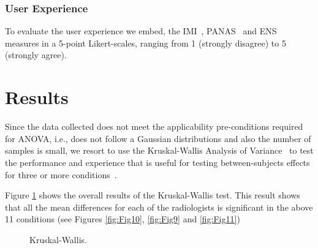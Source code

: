 \documentclass{chi-ext}
\begin{document}
\subsubsection{User Experience}

To evaluate the user experience we embed, the IMI~\cite{ryan1982control}, PANAS~\cite{watson1999panas}
and ENS~\cite{broeck2010capturing} measures in a 5-point Likert-scales,  ranging from 1 (strongly disagree) to 5 (strongly agree).

\section{Results}

Since the data collected does not meet the applicability pre-conditions required for ANOVA, i.e., does not follow a Gaussian distributions and also the number of samples is small, we resort to use the Kruskal-Wallis Analysis of Variance~\cite{theodorsson1986kruskal} to test the performance and experience that is useful for testing between-subjects effects for three or more conditions~\cite{mcfarlane2002comparison}.

Figure \ref{fig:Fig8}  shows the overall results of the Kruskal-Wallis test. This result shows that all the mean differences for each of the radiologists is significant in the above 11 conditions (see Figures \ref{fig:Fig10}, \ref{fig:Fig9} and \ref{fig:Fig11})

\begin{figure}
\caption{Kruskal-Wallis.}
\label{fig:Fig8}
\end{figure}
\end{document}
